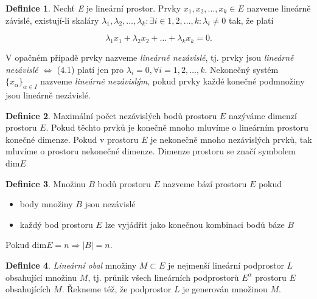 \documentclass[a4]{report}
\theoremstyle{definition}
\newtheorem{definition}{Definice}[section]
\begin{document}
{\begin{definition}
Nechť \textit{E} je lineární prostor. Prvky $x_1, x_2, \ldots, x_k \in E$ nazveme lineárně závislé, existují-li skaláry $\lambda_1, \lambda_2,\ldots,\lambda_k: \exists i \in {1, 2, \ldots, k} : \lambda_i \neq 0 $ tak, že platí 

\begin{equation}
\lambda_1 x_1 + \lambda_2 x_2 + \ldots + \lambda_k x_k = 0.
\end{equation} 

V opačném případě prvky nazveme \textit{lineárně nezávislé}, tj. prvky jsou \textit{lineárně nezávislé} $\Leftrightarrow $ (4.1) platí jen pro  $\lambda_i =0, \forall i = 1, 2, \ldots, k.$ Nekonečný systém $\lbrace x_{\alpha}\rbrace _{\alpha\in I}$ nazveme \textit{lineárně nezávislým}, pokud prvky každé konečné podmnožiny jsou lineárně nezávislé. 
\end{definition}

\begin{definition}
Maximální počet nezávislých bodů prostoru $E$ nazýváme dimenzí prostoru $E$. Pokud těchto prvků je konečně mnoho mluvíme o lineárním prostoru konečné dimenze. Pokud v prostoru $E$ je nekonečně mnoho nezávislých prvků, tak mluvíme o prostoru nekonečné dimenze. Dimenze prostoru se značí symbolem $\mathrm{dim}E$
\end{definition}

\begin{definition}
Množinu $B$ bodů prostoru $E$ nazveme bází prostoru $E$ pokud
\begin{itemize}
\item body množiny $B$ jsou nezávislé 
\item každý bod prostoru $E$ lze vyjádřit jako konečnou kombinaci bodů báze $B$
\end{itemize}
Pokud $\mathrm{dim}E=n \Rightarrow |B|=n$.
\end{definition}

\begin{definition}
\textit{Lineární obal } množiny $M\subset E$ je nejmenší lineární podprostor $L$ obsahující množinu $M$, tj. průnik všech lineárních podprostorů $E^{\alpha}$ prostoru $E$ obsahujících $M$. Řekneme též, že podprostor $L$ je generován množinou $M$.
\end{definition}

}
\end{document}
